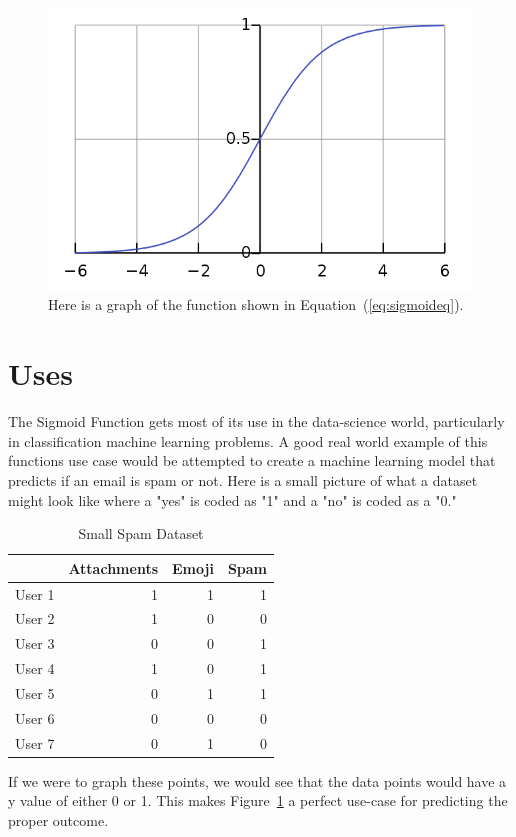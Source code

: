 \documentclass[12pt]{article}
\begin{document}
\begin{figure}[tbp]
\centering
\includegraphics[width=\textwidth]{SigmoidFunction.pdf}
\caption{Here is a graph of the function shown in Equation~(\ref{eq:sigmoideq}).}
\label{fig:sigmoidfunc}
\end{figure}

\section{Uses}
\label{sec:uses}
The Sigmoid Function gets most of its use in the data-science world, particularly 
in classification machine learning problems. A good real world example of this 
functions use case would be attempted to create a machine learning model that 
predicts if an email is spam or not. Here is a small picture of what a dataset might 
look like where a "yes" is coded as "1" and a "no" is coded as a "0."
\begin{table}[h]
  \caption{Small Spam Dataset}
	\label{tab:spam}
\centering
\begin{tabular}{lrrr}
  \toprule
& Attachments & Emoji & Spam \\ 
  \midrule
User 1 & 1 & 1 & 1 \\ 
User 2 & 1 & 0 & 0 \\ 
User 3 & 0 & 0 & 1 \\ 
User 4 & 1 & 0 & 1 \\ 
User 5 & 0 & 1 & 1 \\ 
User 6 & 0 & 0 & 0 \\ 
User 7 & 0 &  1 & 0 \\ 
  \bottomrule
\end{tabular}
\end{table}
If we were to graph these points, we would see that the data points would have a y 
value of either 0 or 1. This makes Figure~\ref{fig:sigmoidfunc} a perfect use-case for 
predicting the proper outcome.
\end{document}
